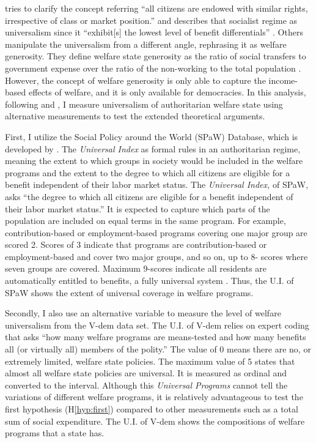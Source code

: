 \documentclass[11pt, notitlepage]{article}
\begin{document}
\citet[25]{Gosta1990} tries to clarify the concept referring ``all citizens are endowed with similar rights, irrespective of class or market position.'' and describes that socialist regime as universalism since it ``exhibit[s] the lowest level of benefit differentials'' \citep[69]{Gosta1990}. Others manipulate the universalism from a different angle, rephrasing it as welfare generosity. They define welfare state generosity as the ratio of social transfers to government expense over the ratio of the non-working to the total population \citep{Iversen2000,Rueda2008,Yi2014}. However, the concept of welfare generosity is only able to capture the income-based effects of welfare, and it is only available for democracies. In this analysis, following \citet{Knutsen2018} and \citet{Rasmussen2019}, I measure universalism of authoritarian welfare state using alternative measurements to test the extended theoretical arguments.

First, I utilize the Social Policy around the World (SPaW) Database, which is developed by \citet{Rasmussen2016}. The \textit{Universal Index} as formal rules in an authoritarian regime, meaning the extent to which groups in society would be included in the welfare programs and the extent to the degree to which all citizens are eligible for a benefit independent of their labor market status. The \textit{Universal Index,} of SPaW, asks ``the degree to which all citizens are eligible for a benefit independent of their labor market status.'' It is expected to capture which parts of the population are included on equal terms in the same program. For example, contribution-based or employment-based programs covering one major group are scored 2. Scores of 3 indicate that programs are contribution-based or employment-based and cover two major groups, and so on, up to 8- scores where seven groups are covered. Maximum 9-scores indicate all residents are automatically entitled to benefits, a fully universal system \citep{Rasmussen2016,Rasmussen2019}. Thus, the U.I. of SPaW shows the extent of universal coverage in welfare programs.

Secondly, I also use an alternative variable to measure the level of welfare universalism from the V-dem data set. The U.I. of V-dem relies on expert coding that asks ``how many welfare programs are means-tested and how many benefits all (or virtually all) members of the polity.'' The value of 0 means there are no, or extremely limited, welfare state policies. The maximum value of 5 states that almost all welfare state policies are universal. It is measured as ordinal and converted to the interval. Although this \textit{Universal Programs} cannot tell the variations of different welfare programs, it is relatively advantageous to test the first hypothesis (H\ref{hyp:first}) compared to other measurements such as a total sum of social expenditure. The U.I. of V-dem shows the compositions of welfare programs  that a state has.
\end{document}
